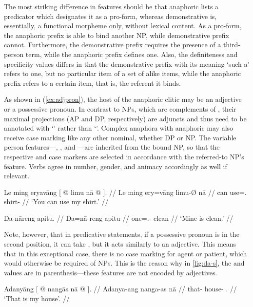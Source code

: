 The most striking difference in features should be that anaphoric 
 lists a predicator which designates it as a pro-form, whereas
demonstrative  is, essentially, a functional morpheme only, 
without lexical content. As a pro-form, the anaphoric prefix is able to
bind another NP, while demonstrative prefix cannot. Furthermore, the 
demonstrative prefix requires the presence of a third-person term, while the
anaphoric prefix defines one. Also, the definiteness and specificity values 
differs in that the demonstrative prefix with its meaning `such a' refers to
one, but no particular item of a set of alike items, while the anaphoric prefix 
refers to a certain item, that is, the referent it binds.

As shown in (\ref{ex:adjpron}), the host of the anaphoric  clitic
may be an adjective or a possessive pronoun. In contrast to NPs, which are
complements of , their maximal projections (AP and DP, respectively)
are adjuncts and thus need to be annotated with `\pass{\Adj}' rather than 
`\updown{}'. Complex anaphora with anaphoric  may also receive
case marking like any other nominal, whether DP or NP. The variable person
features---\Num{}, \Gend{}, and \Anim{}---are inherited from the bound NP, so
that the respective \Aarg{} and \Parg{} case markers are selected in accordance
with the referred-to NP's \Anim{} feature. Verbs agree in number, gender, and
animacy accordingly as well if relevant.

\pex
\a\begingl
	\gla Le ming eryavāng {\normalfont [} @ limu nā @ 
			{\normalfont ]}. //
	\glb Le ming ery=vāng {} limu-Ø nā {} //
	\glc \PatTI{} can use=\Second{}.\Aarg{} {} shirt-\Top{} {} //
	\glft `You can use my shirt.' //
\endgl

\a\begingl
	\gla Da-nāreng apitu. //
	\glb Da=nā-reng apitu //
	\glc one=\Fsg{}.\Gen{}-\AargI{} clean //
	\glft `Mine is clean.' //
\endgl

\xe

Note, however, that in predicative statements, if a possessive pronoun is in the
second position, it can take , but it acts similarly to an
adjective. This means that in this exceptional case, there is no case marking
for agent or patient, which would otherwise be required of NPs. This is the 
reason why in \autoref{fig:da-s}, the \Pers{} and \Def{} values are in parenthesis---these features are not encoded by adjectives.

\pex
\a\begingl
	\gla Adanyāng {\normalfont [} @ nangās nā @ 
		{\normalfont ]}. //
	\glb Adanya-ang {} nanga-as nā {} //
	\glc that-\Aarg{} {} house-\Parg{} \Fsg{}.\Gen{} {} //
	\glft `That is my house'. //
\endgl

